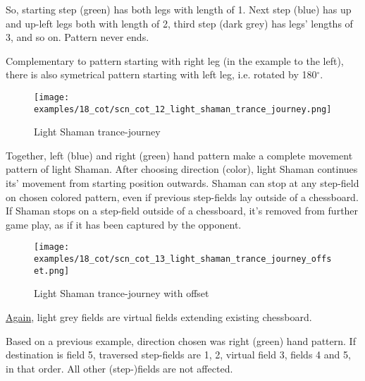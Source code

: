 So, starting step (green) has both legs with length of 1. Next step (blue)
has up and up-left legs both with length of 2, third step (dark grey) has
legs' lengths of 3, and so on. Pattern never ends.

Complementary to pattern starting with right leg (in the example to the
left), there is also symetrical pattern starting with left leg, i.e.
rotated by 180$^{\circ}$. %

\clearpage %

\noindent
\begin{figure}[!h]
\texttt{[image: examples/18\_cot/scn\_cot\_12\_light\_shaman\_trance\_journey.png]}
\caption{Light Shaman trance-journey}
\label{fig:scn_cot_12_light_shaman_trance_journey}
\end{figure}

Together, left (blue) and right (green) hand pattern make a complete movement
pattern of light Shaman. After choosing direction (color), light Shaman
continues its' movement from starting position outwards. Shaman can stop at
any step-field on chosen colored pattern, even if previous step-fields lay
outside of a chessboard. If Shaman stops on a step-field outside of a
chessboard, it's removed from further game play, as if it has been captured
by the opponent.

\clearpage %

\noindent
\begin{figure}[!h]
\texttt{[image: examples/18\_cot/scn\_cot\_13\_light\_shaman\_trance\_journey\_offset.png]}
\caption{Light Shaman trance-journey with offset}
\label{fig:scn_cot_13_light_shaman_trance_journey_offset}
\end{figure}

\hyperref[fig:scn_hd_04_centaur_off_board]{Again},
light grey fields are virtual fields extending existing chessboard.

Based on a previous example, direction chosen was right (green) hand pattern.
If destination is field 5, traversed step-fields are 1, 2, virtual field 3,
fields 4 and 5, in that order. All other (step-)fields are not affected.

\clearpage %

